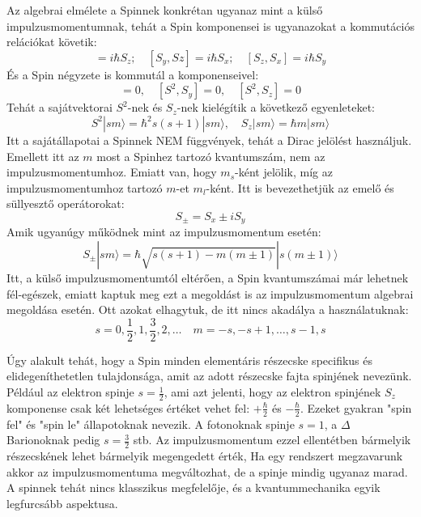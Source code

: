 \documentclass[../main.tex]{subfiles}
\begin{document}
Az algebrai elmélete a Spinnek konkrétan ugyanaz mint a külső impulzusmomentumnak, tehát a Spin komponensei is ugyanazokat a kommutációs relációkat követik:
\begin{equation}
    [S_x, S_y] = i \hbar S_z; \quad [S_y, Sz] = i \hbar S_x; \quad [S_z, S_x] = i \hbar S_y
\end{equation}
És a Spin négyzete is kommutál a komponenseivel:
\begin{equation}
    [S^2, S_x] = 0, \quad [S^2, S_y] = 0, \quad [S^2, S_z] = 0
\end{equation}
Tehát a sajátvektorai $S^2$-nek és $S_z$-nek kielégítik a következő egyenleteket:
\begin{equation}
    S^2 | s m \rangle = \hbar^2 s (s + 1) | s m \rangle, \quad S_z | s m \rangle = \hbar m | s m \rangle
\end{equation}
Itt a sajátállapotai a Spinnek NEM függvények, tehát a Dirac jelölést használjuk. Emellett itt az $m$ most a Spinhez tartozó kvantumszám, nem az impulzusmomentumhoz. Emiatt van, hogy $m_s$-ként jelölik, míg az impulzusmomentumhoz tartozó $m$-et $m_l$-ként.
Itt is bevezethetjük az emelő és süllyesztő operátorokat:
\begin{equation}
    S_\pm = S_x \pm i S_y
\end{equation}
Amik ugyanúgy működnek mint az impulzusmomentum esetén:
\begin{equation}
    S_\pm | s m \rangle = \hbar \sqrt{s (s + 1) - m (m \pm 1)} | s (m \pm 1) \rangle
\end{equation}
Itt, a külső impulzusmomentumtól eltérően, a Spin kvantumszámai már lehetnek fél-egészek, emiatt kaptuk meg ezt a megoldást is az impulzusmomentum algebrai megoldása esetén. Ott azokat elhagytuk, de itt nincs akadálya a használatuknak:
\begin{equation}
    s = 0, \frac{1}{2}, 1, \frac{3}{2}, 2, \ldots \quad m = -s, -s+1, \ldots, s-1, s
\end{equation}

Úgy alakult tehát, hogy a Spin minden elementáris részecske specifikus és elidegeníthetetlen tulajdonsága, amit az adott részecske fajta spinjének nevezünk. Például az elektron spinje $s = \frac{1}{2}$,
ami azt jelenti, hogy az elektron spinjének $S_z$ komponense csak két lehetséges értéket vehet fel: $+\frac{\hbar}{2}$ és $-\frac{\hbar}{2}$. Ezeket gyakran "spin fel" és "spin le" állapotoknak nevezik. A fotonoknak spinje $s = 1$,
a $\Delta$ Barionoknak pedig $s = \frac{3}{2}$ stb. Az impulzusmomentum ezzel ellentétben bármelyik részecskének lehet bármelyik megengedett érték, Ha egy rendszert megzavarunk akkor az impulzusmomentuma megváltozhat,
de a spinje mindig ugyanaz marad. A spinnek tehát nincs klasszikus megfelelője, és a kvantummechanika egyik legfurcsább aspektusa.
\end{document}
